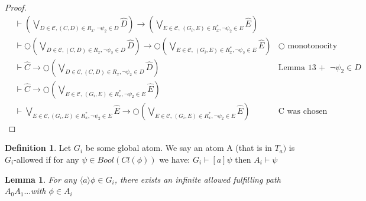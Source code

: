 \documentclass[11pt]{article}
\newtheorem{lemma}[theorem]{Lemma}
\theoremstyle{definition}
\newtheorem{definition}[theorem]{Definition}
\theoremstyle{remark}
\begin{document}
\begin{proof}
    \[
        \begin{array}{rll}
            &\vdash (\bigvee_{D \in \mathcal{C}, (C,D) \in R_x, \neg \psi_2 \in D} \hat{D}) \rightarrow (\bigvee_{E \in \mathcal{C}, \, (G_i,E) \in R_x^*, \neg \psi_2 \in E} \hat{E}) \\
            &\vdash \bigcirc (\bigvee_{D \in \mathcal{C}, (C,D) \in R_x, \neg \psi_2 \in D} \hat{D}) \rightarrow \bigcirc(\bigvee_{E \in \mathcal{C}, \, (G_i,E) \in R_x^*,\neg \psi_2 \in E} \hat{E})
            &\text{$\bigcirc$ monotonocity} \\
            &\vdash \hat{C} \rightarrow \bigcirc (\bigvee_{D \in \mathcal{C}, (C,D) \in R_x, \neg \psi_2 \in D} \hat{D}) 
            &\text{Lemma 13 + }\ \neg \psi_2 \in D \\
            &\vdash \hat{C} \rightarrow \bigcirc(\bigvee_{E \in \mathcal{C}, \, (G_i,E) \in R_x^*,\neg \psi_2 \in E} \hat{E}) \\
            &\vdash \bigvee_{E \in \mathcal{C}, (G_i,E) \in R_x^*, \neg \psi_2 \in E} \hat{E} \rightarrow \bigcirc(\bigvee_{E \in \mathcal{C}, \, (G_i,E) \in R_x^*,\neg \psi_2 \in E} \hat{E}) 
            &\text{C was chosen arbitrary}
        \end{array}
    \]
 \end{proof}




\begin{definition}
    Let $G_i$ be some global atom. We say an atom A (that is in $T_a) $ is $G_i$-allowed if for any $\psi \in 
    Bool(Cl(\phi))$ we have: $G_i \vdash [a] \psi $  then $A_i \vdash \psi$
\end{definition}



\begin{lemma}
    For any $\langle a \rangle \phi \in G_i$, there exists an infinite allowed fulfilling path $A_0A_1...$with $\phi \in A_i$
\end{lemma}
\end{document}
